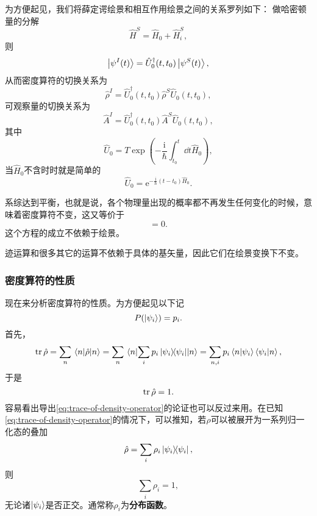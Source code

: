 \documentclass[hyperref, UTF8, a4paper]{ctexart}
\newcommand*{\ii}{\mathrm{i}}
\newcommand*{\ee}{\mathrm{e}}
\begin{document}
为方便起见，我们将薛定谔绘景和相互作用绘景之间的关系罗列如下：
做哈密顿量的分解
\begin{equation}
    \hat{H}^S = \hat{H}_0 + \hat{H}_i^S,
\end{equation}
则
\begin{equation}
    \ket{\psi^I(t)} = \hat{U}_0^\dagger(t,t_0) \ket{\psi^S(t)},
\end{equation}
从而密度算符的切换关系为
\begin{equation}
    \hat{\rho}^I = \hat{U}_0^\dagger(t,t_0) \hat{\rho}^S \hat{U}_0(t,t_0),
\end{equation}
可观察量的切换关系为
\begin{equation}
    \hat{A}^I = \hat{U}_0^\dagger(t,t_0) \hat{A}^S \hat{U}_0(t,t_0),
\end{equation}
其中
\begin{equation}
    \hat{U}_0 = T \exp \left( - \frac{\ii}{\hbar} \int_{t_0}^t \dd{t} \hat{H}_0 \right),
\end{equation}
当$\hat{H}_0$不含时时就是简单的
\begin{equation}
    \hat{U}_0 = \ee^{-\frac{\ii}{\hbar} (t-t_0) \hat{H}_0}.
\end{equation}

系综达到平衡，也就是说，各个物理量出现的概率都不再发生任何变化的时候，意味着密度算符不变，这又等价于
\begin{equation}
    [\hat{\rho}, \hat{H}] = 0.
    \label{eq:equilibrium-case}
\end{equation}
这个方程的成立不依赖于绘景。

迹运算和很多其它的运算不依赖于具体的基矢量，因此它们在绘景变换下不变。

\subsubsection{密度算符的性质}

现在来分析密度算符的性质。为方便起见以下记
\[
    P(\ket{\psi_i}) = p_i.
\]
首先，
\[
    \trace \hat{\rho} = \sum_n \mel{n}{\hat{\rho}}{n} = \sum_n \mel{n}{\sum_i p_i \dyad{\psi_i}}{n} = \sum_{n, i} p_i \braket{n}{\psi_i} \braket{\psi_i}{n},
\]
于是
\begin{equation}
    \trace \hat{\rho} = 1.
    \label{eq:trace-of-density-operator}
\end{equation}
容易看出导出\eqref{eq:trace-of-density-operator}的论证也可以反过来用。在已知\eqref{eq:trace-of-density-operator}的情况下，可以推知，若$\hat{\rho}$可以被展开为一系列归一化态的叠加
\[
    \hat{\rho} = \sum_i \rho_i \dyad{\psi_i},
\]
则
\[
    \sum_i \rho_i = 1,
\]
无论诸$\ket{\psi_i}$是否正交。通常称$\rho_i$为\textbf{分布函数}。
\end{document}

